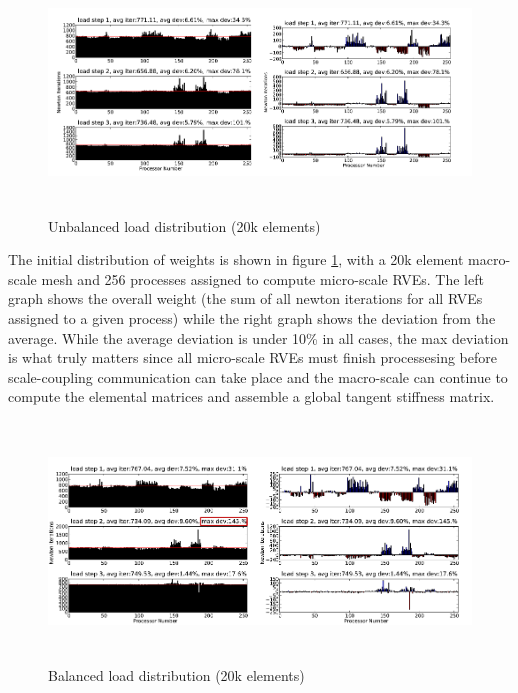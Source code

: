 \begin{figure}
  \begin{center}
    \includegraphics[height=2.5in]{siam_cse_initial.png}
  \end{center}
  \caption{\small Unbalanced load distribution (20k elements)}
  \label{initial_load}
\end{figure}

The initial distribution of weights is shown in figure \ref{initial_load}, with a 20k element macro-scale mesh and 256 processes assigned to compute micro-scale RVEs. The left graph shows the overall weight (the sum of all newton iterations for all RVEs assigned to a given process) while the right graph shows the deviation from the average. While the average deviation is under 10\% in all cases, the max deviation is what truly matters since all micro-scale RVEs must finish processesing before scale-coupling communication can take place and the macro-scale can continue to compute the elemental matrices and assemble a global tangent stiffness matrix. 

\begin{figure}
  \begin{center}
    \includegraphics[height=2.5in]{siam_cse_updated.png}
  \end{center}
  \caption{\small Balanced load distribution (20k elements)}
  \label{load_balancing}
\end{figure}

